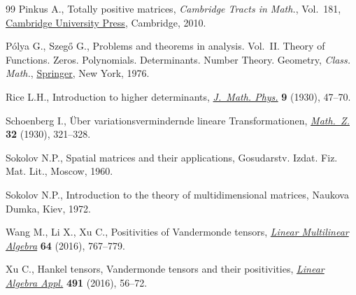 \begin{thebibliography}{99}
Pinkus A., Totally positive matrices, \textit{Cambridge Tracts in Math.}, Vol.~181, \href{https://doi.org/10.1017/CBO9780511691713}{Cambridge University
 Press}, Cambridge, 2010.

P\'olya G., Szeg\H{o} G., Problems and theorems in analysis. {V}ol.~{II}.
 Theory of Functions. Zeros. Polynomials. Determinants. Number Theory.
 Geometry, \textit{Class. Math.},
 \href{https://doi.org/10.1007/978-3-642-61905-2}{Springer}, New York, 1976.

Rice L.H., Introduction to higher determinants,
 \href{https://doi.org/10.1002/sapm19309147}{\textit{J.~Math. Phys.}}
 \textbf{9} (1930), 47--70.

Schoenberg I., \"Uber variationsvermindernde lineare {T}ransformationen,
 \href{https://doi.org/10.1007/BF01194637}{\textit{Math.~Z.}} \textbf{32}
 (1930), 321--328.

Sokolov N.P., Spatial matrices and their applications, Gosudarstv. Izdat. Fiz.
 Mat. Lit., Moscow, 1960.

Sokolov N.P., Introduction to the theory of multidimensional matrices, Naukova
 Dumka, Kiev, 1972.

Wang M., Li X., Xu C., Positivities of {V}andermonde tensors,
 \href{https://doi.org/10.1080/03081087.2015.1122722}{\textit{Linear
 Multilinear Algebra}} \textbf{64} (2016), 767--779.

Xu C., Hankel tensors, {V}andermonde tensors and their positivities,
 \href{https://doi.org/10.1016/j.laa.2015.02.012}{\textit{Linear Algebra
 Appl.}} \textbf{491} (2016), 56--72.

\end{thebibliography}
